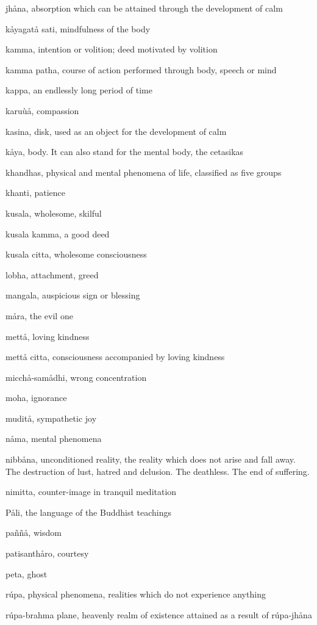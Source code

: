 \documentclass[12pt,twoside]{article}
\begin{document}
jh{\aa}na, absorption which can be attained through the development of
calm

k{\aa}yagat{\aa} sati, mindfulness of the body

kamma, intention or volition; deed motivated by volition

kamma patha, course of action performed through body, speech or mind

kappa, an endlessly long period of time

karu\`u{\aa}, compassion

kasina, disk, used as an object for the development of calm

k{\aa}ya, body. It can also stand for the {\textasciigrave}mental
body{\textquotesingle}, the cetasikas

khandhas, physical and mental phenomena of life, classified as five
groups 

khanti, patience

kusala, wholesome, skilful

kusala kamma, a good deed

kusala citta, wholesome consciousness

lobha, attachment, greed

mangala, auspicious sign or blessing

m{\aa}ra, the evil one

mett{\aa}, loving kindness

mett{\aa} citta, consciousness accompanied by loving kindness

micch{\aa}{}-sam{\aa}dhi, wrong concentration 

moha, ignorance

mudit{\aa}, sympathetic joy

n{\aa}ma, mental phenomena

nibb{\aa}na, unconditioned reality, the reality which does not arise and
fall away. The destruction of lust, hatred and delusion. The deathless.
The end of suffering.

nimitta, counter{}-image in tranquil meditation

P{\aa}li, the language of the Buddhist teachings

pa\~n\~n{\aa}, wisdom

patisanth{\aa}ro, courtesy

peta, ghost

r\'upa, physical phenomena, realities which do not experience anything

r\'upa{}-brahma plane, heavenly realm of existence attained as a result
of r\'upa{}-jh{\aa}na
\end{document}
